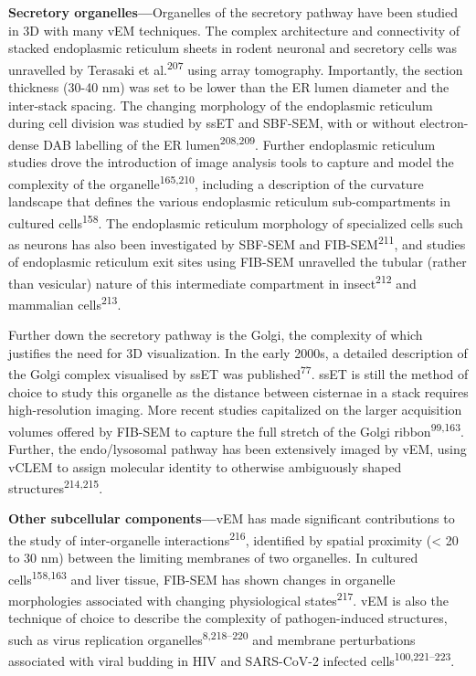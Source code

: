 \documentclass{article}
\begin{document}
\textbf{Secretory organelles—}Organelles of the secretory pathway have been studied in 3D with many vEM techniques. The complex architecture and connectivity of stacked endoplasmic reticulum sheets in rodent neuronal and secretory cells was unravelled by Terasaki et al.\textsuperscript{207} using array tomography. Importantly, the section thickness (30-40 nm) was set to be lower than the ER lumen diameter and the inter-stack spacing. The changing morphology of the endoplasmic reticulum during cell division was studied by ssET and SBF-SEM, with or without electron-dense DAB labelling of the ER lumen\textsuperscript{208,209}. Further endoplasmic reticulum studies drove the introduction of image analysis tools to capture and model the complexity of the organelle\textsuperscript{165,210}, including a description of the curvature landscape that defines the various endoplasmic reticulum sub-compartments in cultured cells\textsuperscript{158}. The endoplasmic reticulum morphology of specialized cells such as neurons has also been investigated by SBF-SEM and FIB-SEM\textsuperscript{211}, and studies of endoplasmic reticulum exit sites using FIB-SEM unravelled the tubular (rather than vesicular) nature of this intermediate compartment in insect\textsuperscript{212} and mammalian cells\textsuperscript{213}.

Further down the secretory pathway is the Golgi, the complexity of which justifies the need for 3D visualization. In the early 2000s, a detailed description of the Golgi complex visualised by ssET was published\textsuperscript{77}. ssET is still the method of choice to study this organelle as the distance between cisternae in a stack requires high-resolution imaging. More recent studies capitalized on the larger acquisition volumes offered by FIB-SEM to capture the full stretch of the Golgi ribbon\textsuperscript{99,163}. Further, the endo/lysosomal pathway has been extensively imaged by vEM, using vCLEM to assign molecular identity to otherwise ambiguously shaped structures\textsuperscript{214,215}.

\textbf{Other subcellular components—}vEM has made significant contributions to the study of inter-organelle interactions\textsuperscript{216}, identified by spatial proximity (< 20 to 30 nm) between the limiting membranes of two organelles. In cultured cells\textsuperscript{158,163} and liver tissue, FIB-SEM has shown changes in organelle morphologies associated with changing physiological states\textsuperscript{217}. vEM is also the technique of choice to describe the complexity of pathogen-induced structures, such as virus replication organelles\textsuperscript{8,218–220} and membrane perturbations associated with viral budding in HIV and SARS-CoV-2 infected cells\textsuperscript{100,221–223}.
\end{document}
